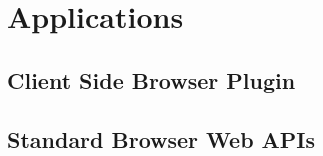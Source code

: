 \section{Applications}


\subsection{Client Side Browser Plugin}

\subsection{Standard Browser Web APIs}

\subsubsection{}

\cleardoublepage